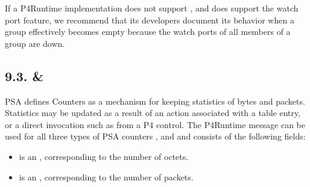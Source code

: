 \documentclass[11pt]{article}
\begin{document}
{%
If a P4Runtime implementation does not support , and
does support the watch port feature, we recommend that its developers document
its behavior when a group effectively becomes empty because the watch ports of
all members of a group are down.%

\subsection{9.3.\hspace*{0.5em} \& }\label{sec-counterentry-directcounterentry}%

\noindent{}PSA defines Counters as a mechanism for keeping statistics of bytes and packets.
Statistics may be updated as a result of an action associated with a table
entry, or a direct invocation such as from a P4 control. The 
P4Runtime message can be used for all three types of PSA counters \textemdash{} ,
 and  \textemdash{} and consists of the following fields:%

\begin{itemize}[noitemsep,topsep=\mdcompacttopsep]%

\item{} is an , corresponding to the number of octets.%

\item{} is an , corresponding to the number of packets.%
\end{itemize}%

}
\end{document}
